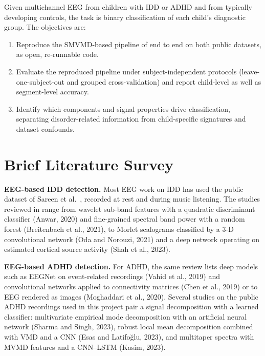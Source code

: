 \documentclass[11pt,a4paper]{article}
\begin{document}
Given multichannel EEG from children with IDD or ADHD and from typically
developing controls, the task is binary classification of each child's
diagnostic group. The objectives are:
\begin{enumerate}
  \item Reproduce the SMVMD-based pipeline of \cite{chandela2025} end to end
        on both public datasets, as open, re-runnable code.
  \item Evaluate the reproduced pipeline under subject-independent protocols
        (leave-one-subject-out and grouped cross-validation) and report
        child-level as well as segment-level accuracy.
  \item Identify which components and signal properties drive
        classification, separating disorder-related information from
        child-specific signatures and dataset confounds.
\end{enumerate}

\section{Brief Literature Survey}

\textbf{EEG-based IDD detection.} Most EEG work on IDD has used the public
dataset of Sareen et al.\ \cite{sareen2020data}, recorded at rest and during
music listening. The studies reviewed in \cite{chandela2025} range from wavelet
sub-band features with a quadratic discriminant classifier (Anwar, 2020) and
fine-grained spectral band power with a random forest (Breitenbach et al.,
2021), to Morlet scalograms classified by a 3-D convolutional network (Oda and
Norouzi, 2021) and a deep network operating on estimated cortical source
activity (Shah et al., 2023).

\textbf{EEG-based ADHD detection.} For ADHD, the same review
\cite{chandela2025} lists deep models such as EEGNet on event-related
recordings (Vahid et al., 2019) and convolutional networks applied to
connectivity matrices (Chen et al., 2019) or to EEG rendered as images
(Moghaddari et al., 2020). Several studies on the public ADHD recordings used
in this project \cite{motie2020} pair a signal decomposition with a learned
classifier: multivariate empirical mode decomposition with an artificial neural
network (Sharma and Singh, 2023), robust local mean decomposition combined with
VMD and a CNN (Esas and Latifo\u{g}lu, 2023), and multitaper spectra with MVMD
features and a CNN--LSTM (Kasim, 2023).
\end{document}
